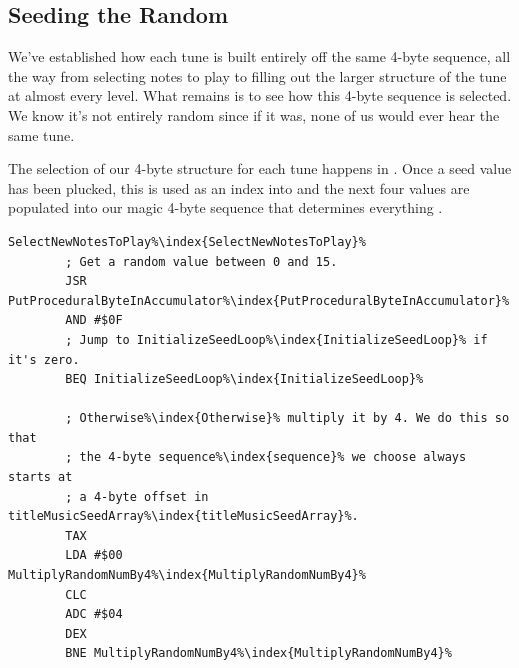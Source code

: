\subsection{Seeding the Random}

We've established how each tune is built entirely off the same 4-byte sequence, all the way from selecting
notes to play to filling out the larger structure of the tune at almost every level. What remains is
to see how this 4-byte sequence is selected. We know it's not entirely random since if it was, none of us
would ever hear the same tune. 

The selection of our 4-byte structure for each tune happens in . Once a seed
value has been plucked, this is used as an index into  and the next four values
are populated into our magic 4-byte sequence that determines everything .

\begin{lstlisting}[escapechar=\%,caption=Put a seed byte in the accumulator and multiply this by 4 if it's not zero. This
gives us what we need for the next step.]
SelectNewNotesToPlay%\index{SelectNewNotesToPlay}%
        ; Get a random value between 0 and 15.
        JSR PutProceduralByteInAccumulator%\index{PutProceduralByteInAccumulator}%
        AND #$0F
        ; Jump to InitializeSeedLoop%\index{InitializeSeedLoop}% if it's zero.
        BEQ InitializeSeedLoop%\index{InitializeSeedLoop}%

        ; Otherwise%\index{Otherwise}% multiply it by 4. We do this so that
        ; the 4-byte sequence%\index{sequence}% we choose always starts at
        ; a 4-byte offset in titleMusicSeedArray%\index{titleMusicSeedArray}%.
        TAX
        LDA #$00
MultiplyRandomNumBy4%\index{MultiplyRandomNumBy4}%   
        CLC
        ADC #$04
        DEX
        BNE MultiplyRandomNumBy4%\index{MultiplyRandomNumBy4}%
\end{lstlisting}

